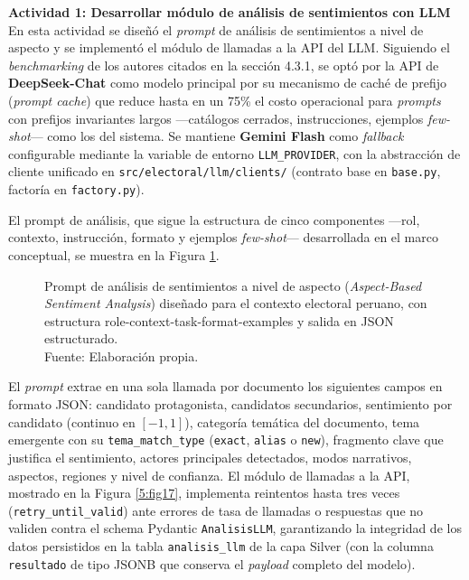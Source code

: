 \textbf{Actividad 1: Desarrollar módulo de análisis de sentimientos con LLM}
\\
En esta actividad se diseñó el \textit{prompt} de análisis de sentimientos a nivel
de aspecto y se implementó el módulo de llamadas a la API del LLM. Siguiendo el
\textit{benchmarking} de los autores citados en la sección 4.3.1, se optó por la
API de \textbf{DeepSeek-Chat} como modelo principal por su mecanismo de caché de
prefijo (\textit{prompt cache}) que reduce hasta en un 75\% el costo operacional
para \textit{prompts} con prefijos invariantes largos —catálogos cerrados,
instrucciones, ejemplos \textit{few-shot}— como los del sistema. Se mantiene
\textbf{Gemini Flash} como \textit{fallback} configurable mediante la variable
de entorno \texttt{LLM\_PROVIDER}, con la abstracción de cliente unificado en
\texttt{src/electoral/llm/clients/} (contrato base en \texttt{base.py}, factoría
en \texttt{factory.py}).

El prompt de análisis, que sigue la estructura de cinco componentes —rol, contexto,
instrucción, formato y ejemplos \textit{few-shot}— desarrollada en el marco conceptual,
se muestra en la Figura \ref{5:fig16}.

\begin{figure}[!ht]
    \begin{center}
        \resizebox{0.85\textwidth}{!}{}
        \caption[Prompt de análisis de sentimientos a nivel de aspecto para el contexto electoral peruano]{Prompt de análisis de sentimientos a nivel de aspecto (\textit{Aspect-Based Sentiment Analysis}) diseñado para el contexto electoral peruano, con estructura role-context-task-format-examples y salida en JSON estructurado.\\Fuente: Elaboración propia.}
        \label{5:fig16}
    \end{center}
\end{figure}

El \textit{prompt} extrae en una sola llamada por documento los siguientes campos en
formato JSON: candidato protagonista, candidatos secundarios, sentimiento por
candidato (continuo en $[-1, 1]$), categoría temática del documento, tema emergente
con su \texttt{tema\_match\_type} (\texttt{exact}, \texttt{alias} o \texttt{new}),
fragmento clave que justifica el sentimiento, actores principales detectados,
modos narrativos, aspectos, regiones y nivel de confianza. El módulo de llamadas a
la API, mostrado en la Figura \ref{5:fig17}, implementa reintentos hasta tres veces
(\texttt{retry\_until\_valid}) ante errores de tasa de llamadas o respuestas que no
validen contra el schema Pydantic \texttt{AnalisisLLM}, garantizando la integridad
de los datos persistidos en la tabla \texttt{analisis\_llm} de la capa Silver
(con la columna \texttt{resultado} de tipo JSONB que conserva el \textit{payload}
completo del modelo).

